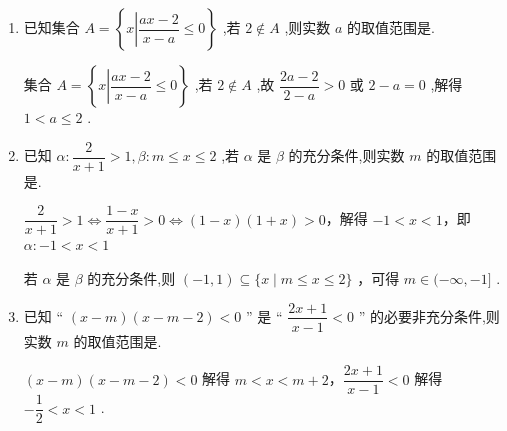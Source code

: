 \begin{enumerate}
\begin{jieda}
\begin{enumerate}
        \end{enumerate}
    \end{jieda}
    \item 已知集合 $A = \left\{  {x\left| {\dfrac{{ax} - 2}{x - a} \leq  0}\right. }\right\}$ ,若 $2 \notin  A$ ,则实数 $a$ 的取值范围是.
    \begin{jieda}
        集合 $A = \left\{  {x\left| {\dfrac{{ax} - 2}{x - a} \leq  0}\right. }\right\}$ ,若 $2 \notin  A$ ,故 $\dfrac{{2a} - 2}{2 - a} > 0$ 或 $2 - a = 0$ ,解得 $1 < a \leq  2$ .
    \end{jieda}
    \item 已知 $\alpha  : \dfrac{2}{x + 1} > 1,\beta  : m \leq  x \leq  2$ ,若 $\alpha$ 是 $\beta$ 的充分条件,则实数 $m$ 的取值范围是\blkda[4]{$(-\infty, -1]$}.
    \begin{jieda}
        $\dfrac{2}{x + 1} > 1 \Longleftrightarrow \dfrac{1 - x}{x + 1} > 0\Longleftrightarrow \left( {1 - x}\right) \left( {1 + x}\right)  > 0$，解得 $- 1 < x < 1$，即 $\alpha  :  - 1 < x < 1$ 
        
        若 $\alpha$ 是 $\beta$ 的充分条件,则 $(-1, 1) \subseteq \{ x \mid  m \leq  x \leq  2\}$ ，可得 $m \in (-\infty, -1]$ .
    \end{jieda}
    
    \item 已知 “ $\left( {x - m}\right) \left( {x - m - 2}\right)  < 0$ ” 是 “ $\dfrac{{2x} + 1}{x - 1} < 0$ ” 的必要非充分条件,则实数 $m$ 的取值范围是.
    \begin{jieda}
        $\left( {x - m}\right) \left( {x - m - 2}\right)  < 0$ 解得 $m < x < m + 2$，$\dfrac{{2x} + 1}{x - 1} < 0$ 解得 $- \dfrac{1}{2} < x < 1$ .
        

\end{jieda}
\end{enumerate}
